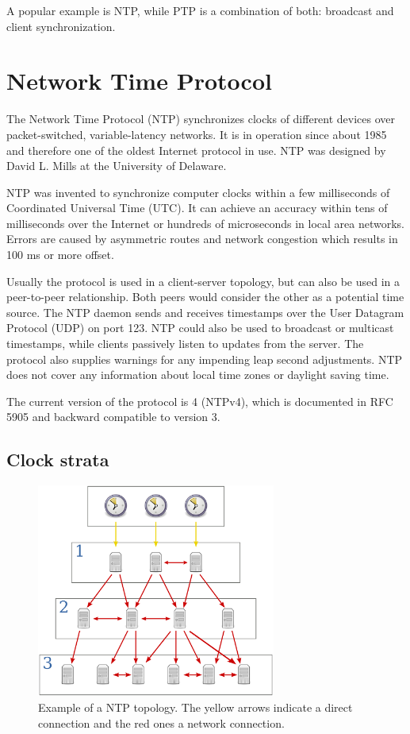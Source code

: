 A popular example is NTP, while PTP is a combination of both: broadcast and client synchronization.

\section{Network Time Protocol}

The Network Time Protocol (NTP) synchronizes clocks of different devices over packet-switched, variable-latency networks. It is in operation since about 1985 and therefore one of the oldest Internet protocol in use. NTP was designed by David L. Mills at the University of Delaware.

NTP was invented to synchronize computer clocks within a few milliseconds of Coordinated Universal Time (UTC). It can achieve an accuracy within tens of milliseconds over the Internet or hundreds of microseconds in local area networks. Errors are caused by asymmetric routes and network congestion which results in 100 ms or more offset.

Usually the protocol is used in a client-server topology, but can also be used in a peer-to-peer relationship. Both peers would consider the other as a potential time source. The NTP daemon sends and receives timestamps over the User Datagram Protocol (UDP) on port 123. NTP could also be used to broadcast or multicast timestamps, while clients passively listen to updates from the server. The protocol also supplies warnings for any impending leap second adjustments. NTP does not cover any information about local time zones or daylight saving time.

The current version of the protocol is 4 (NTPv4), which is documented in RFC 5905 and backward compatible to version 3.

\subsection{Clock strata}

\begin{figure}[tb]
	\centering
	\includegraphics[width=0.7\textwidth]{figures/ntp_strata.png}
	\caption{Example of a NTP topology. The yellow arrows indicate a direct connection and the red ones a network connection.}
	\label{fig:ntp_strata}
\end{figure}


